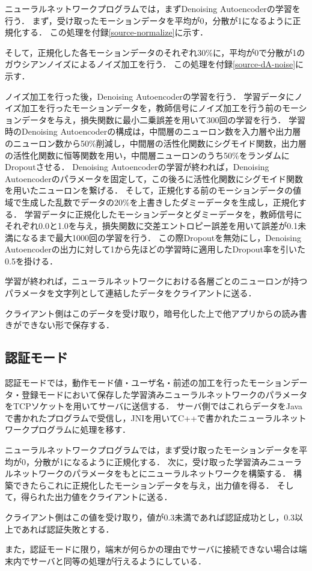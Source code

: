 ニューラルネットワークプログラムでは，まずDenoising Autoencoderの学習を行う．
まず，受け取ったモーションデータを平均が0，分散が1になるように正規化する．
この処理を付録\ref{source-normalize}に示す．

そして，正規化した各モーションデータのそれぞれ30\%に，平均が0で分散が1のガウシアンノイズによるノイズ加工を行う．
この処理を付録\ref{source-dA-noise}に示す．

ノイズ加工を行った後，Denoising Autoencoderの学習を行う．
学習データにノイズ加工を行ったモーションデータを，教師信号にノイズ加工を行う前のモーションデータを与え，損失関数に最小二乗誤差を用いて300回の学習を行う．
学習時のDenoising Autoencoderの構成は，中間層のニューロン数を入力層や出力層のニューロン数から50\%削減し，中間層の活性化関数にシグモイド関数，出力層の活性化関数に恒等関数を用い，中間層ニューロンのうち50\%をランダムにDropoutさせる．
Denoising Autoencoderの学習が終われば，Denoising Autoencoderのパラメータを固定して，この後ろに活性化関数にシグモイド関数を用いたニューロンを繋げる．
そして，正規化する前のモーションデータの値域で生成した乱数でデータの20\%を上書きしたダミーデータを生成し，正規化する．
学習データに正規化したモーションデータとダミーデータを，教師信号にそれぞれ0.0と1.0を与え，損失関数に交差エントロピー誤差を用いて誤差が0.1未満になるまで最大1000回の学習を行う．
この際Dropoutを無効にし，Denoising Autoencoderの出力に対して1から先ほどの学習時に適用したDropout率を引いた0.5を掛ける．

学習が終われば，ニューラルネットワークにおける各層ごとのニューロンが持つパラメータを文字列として連結したデータをクライアントに送る．

クライアント側はこのデータを受け取り，暗号化した上で他アプリからの読み書きができない形で保存する．

\subsection{認証モード}
認証モードでは，動作モード値・ユーザ名・前述の加工を行ったモーションデータ・登録モードにおいて保存した学習済みニューラルネットワークのパラメータをTCPソケットを用いてサーバに送信する．
サーバ側ではこれらデータをJavaで書かれたプログラムで受信し，JNIを用いてC++で書かれたニューラルネットワークプログラムに処理を移す．

ニューラルネットワークプログラムでは，まず受け取ったモーションデータを平均が0，分散が1になるように正規化する．
次に，受け取った学習済みニューラルネットワークのパラメータをもとにニューラルネットワークを構築する．
構築できたらこれに正規化したモーションデータを与え，出力値を得る．
そして，得られた出力値をクライアントに送る．

クライアント側はこの値を受け取り，値が0.3未満であれば認証成功とし，0.3以上であれば認証失敗とする．

また，認証モードに限り，端末が何らかの理由でサーバに接続できない場合は端末内でサーバと同等の処理が行えるようにしている．
